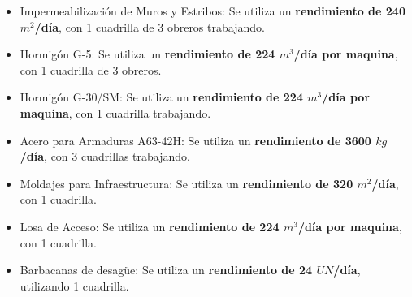 \begin{itemize}
\begin{itemize}
        \item Impermeabilización de Muros y Estribos: Se utiliza un \textbf{rendimiento de 240 $m^2$/día}, con 1 cuadrilla de 3 obreros trabajando.
        \item Hormigón G-5: Se utiliza un \textbf{rendimiento de 224 $m^3$/día por maquina}, con 1 cuadrilla de 3 obreros.
        \item Hormigón G-30/SM: Se utiliza un \textbf{rendimiento de 224 $m^3$/día por maquina}, con 1 cuadrilla trabajando.
        \item Acero para Armaduras A63-42H: Se utiliza un \textbf{rendimiento de 3600 $kg$/día}, con 3 cuadrillas trabajando.
        \item Moldajes para Infraestructura: Se utiliza un \textbf{rendimiento de 320 $m^2$/día}, con 1 cuadrilla.
        \item Losa de Acceso: Se utiliza un \textbf{rendimiento de 224 $m^3$/día por maquina}, con 1 cuadrilla.
        \item Barbacanas de desagüe: Se utiliza un \textbf{rendimiento de 24 $UN$/día}, utilizando 1 cuadrilla.
    \end{itemize}
\end{itemize}